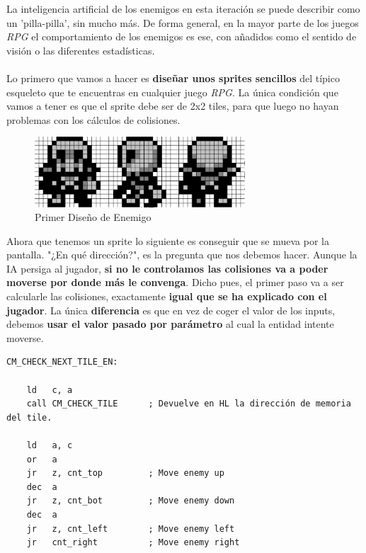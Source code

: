 La inteligencia artificial de los enemigos en esta iteración se puede describir como un 'pilla-pilla', sin mucho más. De forma general, en la mayor parte de los juegos \textit{RPG} el comportamiento de los enemigos es ese, con añadidos como el sentido de visión o las diferentes estadísticas.
\\ \\
Lo primero que vamos a hacer es \textbf{diseñar unos sprites sencillos} del típico esqueleto que te encuentras en cualquier juego \textit{RPG}. La única condición que vamos a tener es que el sprite debe ser de 2x2 tiles, para que luego no hayan problemas con los cálculos de colisiones.

\clearpage

\begin{figure}[h]
\centering
\includegraphics[width=0.7\textwidth]{include/images/desarrollo/enemy_sprite.png}
\caption{Primer Diseño de Enemigo}
\label{figure:enemy_sprite}
\end{figure}

Ahora que tenemos un sprite lo siguiente es conseguir que se mueva por la pantalla. "¿En qué dirección?", es la pregunta que nos debemos hacer. Aunque la IA persiga al jugador, \textbf{si no le controlamos las colisiones va a poder moverse por donde más le convenga}. Dicho pues, el primer paso va a ser calcularle las colisiones, exactamente \textbf{igual que se ha explicado con el jugador}. La única \textbf{diferencia} es que en vez de coger el valor de los inputs, debemos \textbf{usar el valor pasado por parámetro} al cual la entidad intente moverse.

\begin{lstlisting}[caption={Comprobación de Colisiones del Enemigo}, label={code:check_tile_en}]
CM_CHECK_NEXT_TILE_EN:

	ld 	 c, a
	call CM_CHECK_TILE 		; Devuelve en HL la dirección de memoria del tile.

	ld 	 a, c
	or 	 a
	jr 	 z, cnt_top 		; Move enemy up
	dec  a
	jr 	 z, cnt_bot 		; Move enemy down
	dec  a
	jr 	 z, cnt_left 		; Move enemy left
	jr 	 cnt_right 			; Move enemy right
\end{lstlisting}

